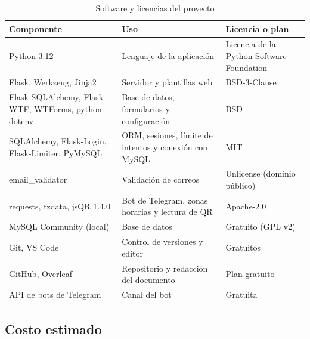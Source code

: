 \documentclass[journal,onecolumn,12pt,draftclsnofoot]{IEEEtran}
\begin{document}
\begin{table}[htbp]
\centering
\caption{Software y licencias del proyecto}\label{tab:licencias}
\small
\setlength{\tabcolsep}{4pt}
\begin{tabular}{|p{}|p{}|p{}|}
\hline
\textbf{Componente} & \textbf{Uso} & \textbf{Licencia o plan} \\ \hline
Python 3.12 & Lenguaje de la aplicación & Licencia de la Python Software Foundation \\ \hline
Flask, Werkzeug, Jinja2 & Servidor y plantillas web & BSD-3-Clause \\ \hline
Flask-SQLAlchemy, Flask-WTF, WTForms, python-dotenv & Base de datos, formularios y configuración & BSD \\ \hline
SQLAlchemy, Flask-Login, Flask-Limiter, PyMySQL & ORM, sesiones, límite de intentos y conexión con MySQL & MIT \\ \hline
email\_validator & Validación de correos & Unlicense (dominio público) \\ \hline
requests, tzdata, jsQR 1.4.0 & Bot de Telegram, zonas horarias y lectura de QR & Apache-2.0 \\ \hline
MySQL Community (local) & Base de datos & Gratuito (GPL v2) \\ \hline
Git, VS Code & Control de versiones y editor & Gratuitos \\ \hline
GitHub, Overleaf & Repositorio y redacción del documento & Plan gratuito \\ \hline
API de bots de Telegram & Canal del bot & Gratuita \\ \hline
\end{tabular}
\end{table}

\subsection{Costo estimado}
\end{document}
